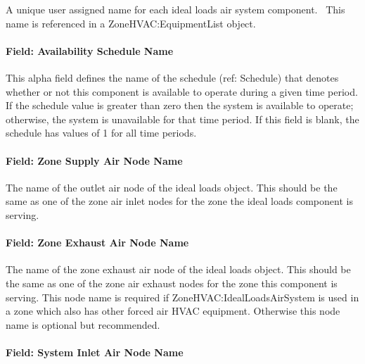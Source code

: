 A unique user assigned name for each ideal loads air system component.~ This name is referenced in a ZoneHVAC:EquipmentList object.

\paragraph{Field: Availability Schedule Name}\label{field-availability-schedule-name-020}

This alpha field defines the name of the schedule (ref: Schedule) that denotes whether or not this component is available to operate during a given time period. If the schedule value is greater than zero then the system is available to operate; otherwise, the system is unavailable for that time period. If this field is blank, the schedule has values of 1 for all time periods.

\paragraph{Field: Zone Supply Air Node Name}\label{field-zone-supply-air-node-name-001}

The name of the outlet air node of the ideal loads object. This should be the same as one of the zone air inlet nodes for the zone the ideal loads component is serving.

\paragraph{Field: Zone Exhaust Air Node Name}\label{field-zone-exhaust-air-node-name}

The name of the zone exhaust air node of the ideal loads object. This should be the same as one of the zone air exhaust nodes for the zone this component is serving. This node name is required if ZoneHVAC:IdealLoadsAirSystem is used in a zone which also has other forced air HVAC equipment. Otherwise this node name is optional but recommended.

\paragraph{Field: System Inlet Air Node Name}\label{system-inlet-air-node-name}


